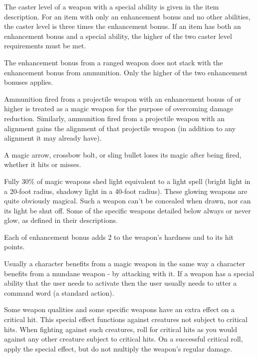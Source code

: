  The caster level of a weapon with a special ability is given in the item description. For an item with only an enhancement bonus and no other abilities, the caster level is three times the enhancement bonus. If an item has both an enhancement bonus and a special ability, the higher of the two caster level requirements must be met.

 The enhancement bonus from a ranged weapon does not stack with the enhancement bonus from ammunition. Only the higher of the two enhancement bonuses applies.

Ammunition fired from a projectile weapon with an enhancement bonus of  or higher is treated as a magic weapon for the purpose of overcoming damage reduction. Similarly, ammunition fired from a projectile weapon with an alignment gains the alignment of that projectile weapon (in addition to any alignment it may already have).

 A magic arrow, crossbow bolt, or sling bullet loses its magic after being fired, whether it hits or misses.

 Fully 30\% of magic weapons shed light equivalent to a light spell (bright light in a 20-foot radius, shadowy light in a 40-foot radius). These glowing weapons are quite obviously magical. Such a weapon can't be concealed when drawn, nor can its light be shut off. Some of the specific weapons detailed below always or never glow, as defined in their descriptions.

 Each  of enhancement bonus adds 2 to the weapon's hardness and  to its hit points.

 Usually a character benefits from a magic weapon in the same way a character benefits from a mundane weapon - by attacking with it. If a weapon has a special ability that the user needs to activate then the user usually needs to utter a command word (a standard action).

 Some weapon qualities and some specific weapons have an extra effect on a critical hit. This special effect functions against creatures not subject to critical hits. When fighting against such creatures, roll for critical hits as you would against any other creature subject to critical hits. On a successful critical roll, apply the special effect, but do not multiply the weapon's regular damage.


